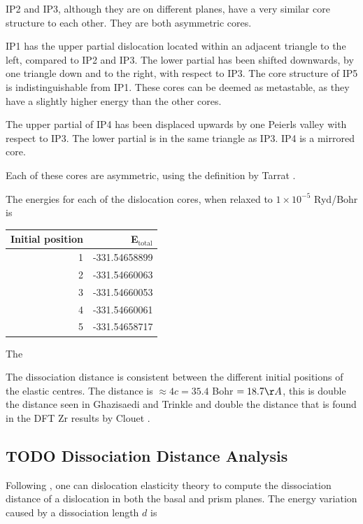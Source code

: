 \documentclass[11pt]{article}
\begin{document}
IP2 and IP3, although they are on different planes, have a very
similar core structure to each other. They are both asymmetric
cores. 


IP1 has the upper partial dislocation located within an adjacent
triangle to the left, compared to IP2 and IP3. The lower partial
has been shifted downwards, by one triangle down and to the right,
with respect to IP3. The core structure of IP5 is
indistinguishable from IP1. These cores can be deemed as
metastable, as they have a slightly higher energy than the other
cores.


The upper partial of IP4 has been displaced upwards by one Peierls
valley with respect to IP3. The lower partial is in the same
triangle as IP3. IP4 is a mirrored core. 


Each of these cores are asymmetric, using the definition by Tarrat
\cite{Tarrat2009}. 

The energies for each of the dislocation cores, when relaxed to
\(1\times 10^{-5}\) Ryd/Bohr is 

\begin{center}
\begin{tabular}{rr}
Initial position & E\(_{\text{total}}\)\\
\hline
1 & -331.54658899\\
2 & -331.54660063\\
3 & -331.54660053\\
4 & -331.54660061\\
5 & -331.54658717\\
\end{tabular}
\end{center}

The 



The dissociation distance is consistent between the different
initial positions of the elastic centres. The distance is \(\approx4c =
    35.4\) Bohr \(= 18.7 \AA\), this is double the distance seen in
Ghazisaedi and Trinkle \cite{Ghazisaeidi2012} and double the
distance that is found in the DFT Zr results by Clouet
\cite{Clouet2012}.



\subsection{{\bfseries\sffamily TODO} Dissociation Distance Analysis}
\label{sec:org761ce4a}
Following \cite{Clouet2012}, one can dislocation elasticity theory to
compute the dissociation distance of a dislocation in both the
basal and prism planes.  The energy variation caused by a
dissociation length \(d\) is
\end{document}
